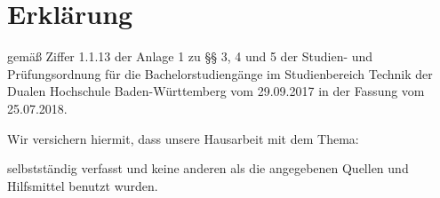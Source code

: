 \begin{comment}
\chapter*{Sperrvermerk} %
gemäß Ziffer 1.1.13 der Anlage 1 zu §§ 3, 4 und 5  der Studien- und Prüfungsordnung für die Bachelorstudiengänge im Studienbereich Technik der Dualen Hochschule Baden-Württemberg vom 29.09.2017 in der Fassung vom 25.07.2018:

Der Inhalt dieser Arbeit darf weder als Ganzes noch in Auszügen Personen außerhalb des Prüfungsprozesses und des Evaluationsverfahrens zugänglich gemacht werden, sofern keine anders lautende Genehmigung vom Dualen Partner vorliegt.\\[4ex]

\city, den \today \\[1ex]

\makebox[7cm]{\rule[-0.2cm]{7cm}{0.5pt}} \hfill \makebox[7cm]{\rule[-0.2cm]{7cm}{0.5pt}} \\ %
\makebox[7cm]{\autorone} \hfill \makebox[7cm]{\autortwo} \\[10ex] %
\end{comment}
\chapter*{Erklärung} %

gemäß Ziffer 1.1.13 der Anlage 1 zu §§ 3, 4 und 5  der Studien- und Prüfungsordnung für die Bachelorstudiengänge im Studienbereich Technik der Dualen Hochschule Baden-Württemberg vom 29.09.2017 in der Fassung vom 25.07.2018.

Wir versichern hiermit, dass unsere Hausarbeit mit dem Thema:
\begin{comment}
Richtiges Auswählen:
Ich versichere hiermit, dass ich meine Bachelorarbeit (bzw. Projektarbeit oder Studienarbeit bzw. Hausarbeit) mit dem Thema:
\end{comment}
\begin{quote}
	\textit{\titel}\textit{ \untertitel }
\end{quote}

selbstständig verfasst und keine anderen als die angegebenen Quellen und Hilfsmittel benutzt wurden.\\[1ex]

